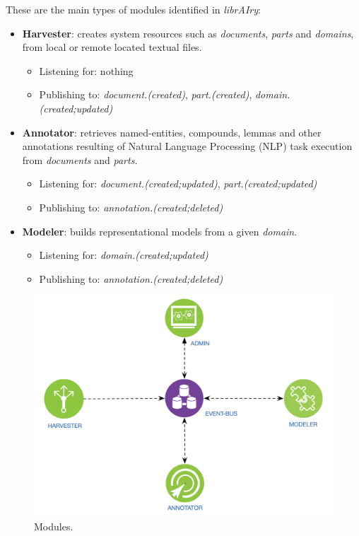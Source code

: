These are the main types of modules identified in \textit{librAIry}:
\begin{itemize}
	\item \textbf{Harvester}: creates system resources such as \textit{documents}, \textit{parts} and \textit{domains}, from local or remote located textual files.
    \begin{itemize}[rightmargin=\dimexpr\linewidth-5cm-\leftmargin\relax]
    	\item Listening for: nothing
		\item Publishing to: \textit{document.(created)}, 
        \textit{part.(created)}, \textit{domain.(created;updated)}
    \end{itemize}
    \item \textbf{Annotator}: retrieves named-entities, compounds, lemmas and other annotations resulting of Natural Language Processing (NLP) task execution from \textit{documents} and \textit{parts}.
    \begin{itemize}[rightmargin=\dimexpr\linewidth-5cm-\leftmargin\relax]
    	\item Listening for: \textit{document.(created;updated)}, \textit{part.(created;updated)}
		\item Publishing to: \textit{annotation.(created;deleted)}
    \end{itemize}
    \item \textbf{Modeler}: builds representational models from a given \textit{domain}. 
    \begin{itemize}[rightmargin=\dimexpr\linewidth-5cm-\leftmargin\relax]
    	\item Listening for: \textit{domain.(created;updated)}
		\item Publishing to: \textit{annotation.(created;deleted)}
    \end{itemize}
\end{itemize}

\begin{figure}
  \includegraphics[scale=0.25]{modules}
  \caption{Modules.}
  \label{fig:librairy-modules}
\end{figure}


